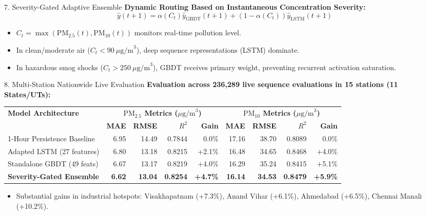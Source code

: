 \documentclass[aspectratio=169]{beamer}
\begin{document}
\begin{frame}{7. Severity-Gated Adaptive Ensemble}
  \textbf{Dynamic Routing Based on Instantaneous Concentration Severity:}
  $$\hat{y}(t+1) = \alpha(C_t) \hat{y}_{\text{GBDT}}(t+1) + (1 - \alpha(C_t)) \hat{y}_{\text{LSTM}}(t+1)$$
  \begin{itemize}
    \item $C_t = \max(\text{PM}_{2.5}(t), \text{PM}_{10}(t))$ monitors real-time pollution level.
    \item In clean/moderate air ($C_t < 90\ \mu\text{g/m}^3$), deep sequence representations (LSTM) dominate.
    \item In hazardous smog shocks ($C_t > 250\ \mu\text{g/m}^3$), GBDT receives primary weight, preventing recurrent activation saturation.
  \end{itemize}
\end{frame}

\begin{frame}{8. Multi-Station Nationwide Live Evaluation}
  \textbf{Evaluation across 236,289 live sequence evaluations in 15 stations (11 States/UTs):}
  \begin{table}
    \centering
    \scriptsize
    \begin{tabular}{lrrrrrrrr}
      \toprule
      \textbf{Model Architecture} & \multicolumn{4}{c}{\textbf{$\text{PM}_{2.5}$ Metrics ($\mu\text{g/m}^3$)}} & \multicolumn{4}{c}{\textbf{$\text{PM}_{10}$ Metrics ($\mu\text{g/m}^3$)}} \\
      \cmidrule(lr){2-5} \cmidrule(lr){6-9}
      & \textbf{MAE} & \textbf{RMSE} & \textbf{$R^2$} & \textbf{Gain} & \textbf{MAE} & \textbf{RMSE} & \textbf{$R^2$} & \textbf{Gain} \\
      \midrule
      1-Hour Persistence Baseline & 6.95 & 14.49 & 0.7844 & 0.0\% & 17.16 & 38.70 & 0.8089 & 0.0\% \\
      Adapted LSTM (27 features)  & 6.80 & 13.18 & 0.8215 & +2.1\% & 16.48 & 34.65 & 0.8468 & +4.0\% \\
      Standalone GBDT (49 feats)  & 6.67 & 13.17 & 0.8219 & +4.0\% & 16.29 & 35.24 & 0.8415 & +5.1\% \\
      \textbf{Severity-Gated Ensemble} & \textbf{6.62} & \textbf{13.04} & \textbf{0.8254} & \textbf{+4.7\%} & \textbf{16.14} & \textbf{34.53} & \textbf{0.8479} & \textbf{+5.9\%} \\
      \bottomrule
    \end{tabular}
  \end{table}
  \begin{itemize}
    \item Substantial gains in industrial hotspots: Visakhapatnam (+7.3\%), Anand Vihar (+6.1\%), Ahmedabad (+6.5\%), Chennai Manali (+10.2\%).
  \end{itemize}
\end{frame}
\end{document}
